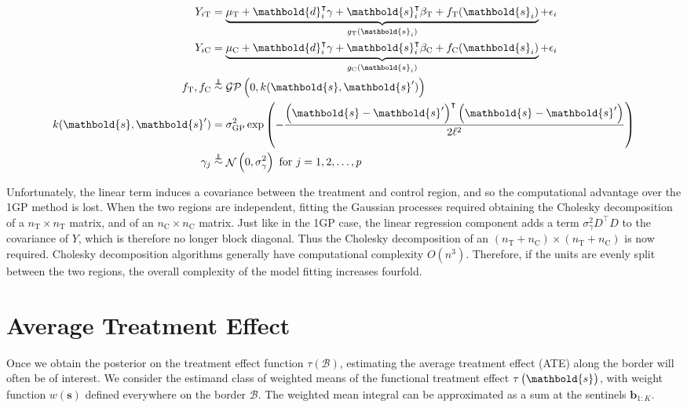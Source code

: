 \documentclass[letter]{article}
\DeclareMathOperator{\normal}{\mathcal{N}}
\newcommand{\gp}{\mathcal{GP}}
\newcommand{\trans}{^{\intercal}}
\newcommand{\treat}{\mathrm{T}}
\newcommand{\ctrol}{\mathrm{C}}
\newcommand{\sigmaf}{\sigma_{\mathrm{GP}}}
\newcommand{\sigmagamma}{\sigma_{\gamma}}
\newcommand{\svec}{\mathbold{s}}
\newcommand{\dvec}{\mathbold{d}}
\newcommand{\indep}{\protect\mathpalette{\protect\independenT}{\perp}}
\def\independenT#1#2{\mathrel{\rlap{$#1#2$}\mkern2mu{#1#2}}}
\newcommand{\boundary}{\mathcal{B}}
\newcommand{\sentinels}{\bm{b}}
\begin{document}
\begin{equation}
\begin{split}
Y_{i\treat} &= \underbrace{\mu_\treat{} + \dvec_i\trans \gamma + \svec_i\trans\beta_\treat{} + f_\treat{}(\svec_i)}_{g_\treat{}(\svec_i)} + \epsilon_i \\
Y_{i\ctrol} &= \underbrace{\mu_\ctrol{} + \dvec_i\trans \gamma + \svec_i\trans\beta_\ctrol{} + f_\ctrol{}(\svec_i)}_{g_\ctrol{}(\svec_i)} + \epsilon_i \\
f_\treat{}, f_\ctrol{} &\overset{\indep}{\sim} \gp\del{0, k(\svec, \svec')} \\
k(\svec,\svec') &= \sigmaf^2 \exp\del{ - \frac{\del{\svec-\svec'}\trans\del{\svec-\svec'}}{2 \ell^2}} \\
\gamma_j &\overset{\indep}{\sim} \normal\del{0,\sigmagamma^2}\text{ for }j=1,2,\ldots,p
\end{split}
\end{equation}

Unfortunately, the linear term induces a covariance between the treatment and control region, and so the computational advantage over the 1GP method is lost.
When the two regions are independent, fitting the Gaussian processes required obtaining the Cholesky decomposition of a \(n_\treat{} \times n_\treat{}\) matrix, and of an \(n_\ctrol{} \times n_\ctrol{}\) matrix.
Just like in the 1GP case, the linear regression component adds a term \(\sigmagamma^2 D\trans D\) to the covariance of \(Y\), which is therefore no longer block diagonal.
Thus the Cholesky decomposition of an \((n_\treat{}+n_\ctrol{}) \times (n_\treat{}+n_\ctrol{})\) is now required.
Cholesky decomposition algorithms generally have computational complexity \(O(n^3)\).
Therefore, if the units are evenly split between the two regions,
the overall complexity of the model fitting increases fourfold.
    


    	\section{Average Treatment Effect}\label{average-treatment-effect}
    

\label{sec:ate}
    	Once we obtain the posterior on the treatment effect function \(\tau(\boundary)\), estimating the average treatment effect (ATE) along the border will often be of interest.
We consider the estimand class of weighted means of the functional treatment effect \(\tau\del{\svec}\),
with weight function \(w(\svec)\) defined everywhere on the border \(\boundary\).
The weighted mean integral can be approximated as a sum at the sentinels \(\sentinels_{1:K}\).
\end{document}
